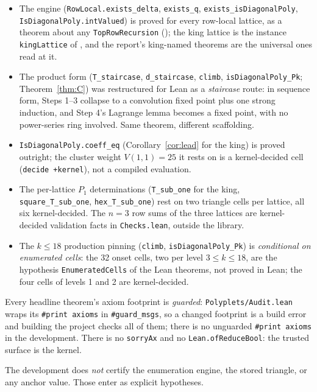 \documentclass[11pt]{article}
\begin{document}
\begin{itemize}
\item The engine (\texttt{RowLocal.exists\_delta},
  \texttt{exists\_q}, \texttt{exists\_isDiagonalPoly},
  \texttt{IsDiagonalPoly.intValued}) is proved for every row-local
  lattice, as a theorem about any \texttt{TopRowRecursion}
  (); the king lattice is the instance
  \texttt{kingLattice} of , and the
  report's king-named theorems are the universal ones read at it.
\item The product form (\texttt{T\_staircase}, \texttt{d\_staircase},
  \texttt{climb}, \texttt{isDiagonalPoly\_Pk}; Theorem~\ref{thm:C}) was
  restructured for Lean as a \emph{staircase} route: in sequence form, Steps 1--3
  collapse to a convolution fixed point plus one strong induction, and Step 4's
  Lagrange lemma becomes a fixed point, with no power-series ring involved. Same
  theorem, different scaffolding.
\item \texttt{IsDiagonalPoly.coeff\_eq} (Corollary~\ref{cor:lead} for the
  king) is proved outright; the cluster weight $V(1,1) = 25$ it rests on is a
  kernel-decided cell (\texttt{decide +kernel}), not a compiled evaluation.
\item The per-lattice $P_1$ determinations (\texttt{T\_sub\_one} for the king,
  \texttt{square\_T\_sub\_one}, \texttt{hex\_T\_sub\_one}) rest on two
  triangle cells per lattice, all six kernel-decided. The $n = 3$ row sums of the
  three lattices are kernel-decided validation facts in \texttt{Checks.lean},
  outside the library.
\item The $k \le 18$ production pinning (\texttt{climb},
  \texttt{isDiagonalPoly\_Pk}) is \emph{conditional on enumerated cells}: the 32 onset
  cells, two per level $3 \le k \le 18$, are the hypothesis
  \texttt{EnumeratedCells} of the Lean theorems, not proved in Lean; the four
  cells of levels 1 and 2 are kernel-decided.
\end{itemize}

Every headline theorem's axiom footprint is \emph{guarded}:
\texttt{Polyplets/Audit.lean} wraps its \texttt{\#print axioms} in
\texttt{\#guard\_msgs}, so a changed footprint is a build error and building
the project checks all of them; there is no unguarded \texttt{\#print axioms}
in the development. There is no \texttt{sorryAx} and no
\texttt{Lean.ofReduceBool}: the trusted surface is the kernel.

The development does \emph{not} certify the enumeration engine, the stored
triangle, or any anchor value. Those enter as explicit hypotheses.
\end{document}
